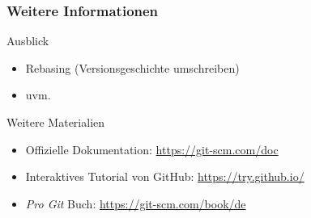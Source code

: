 \documentclass[accentcolor=tud8b,colorbacktitle,inverttitle,landscape,german,presentation,t]{tudbeamer}
\begin{document}
			\begin{frame}
				\frametitle{Weitere Informationen}
					\begin{block}{Ausblick}
						\begin{itemize}
							\item Rebasing (Versionsgeschichte umschreiben)
							\item uvm.
						\end{itemize}
					\end{block}
					\begin{block}{Weitere Materialien}
						\begin{itemize}
							\item Offizielle Dokumentation: \href{https://git-scm.com/doc}{https://git-scm.com/doc}
							\item Interaktives Tutorial von GitHub: \href{https://try.github.io/}{https://try.github.io/}
							\item \textit{Pro Git} Buch: \href{https://git-scm.com/book/de}{https://git-scm.com/book/de}
						\end{itemize}
					\end{block}
			\end{frame}
	
\end{document}
